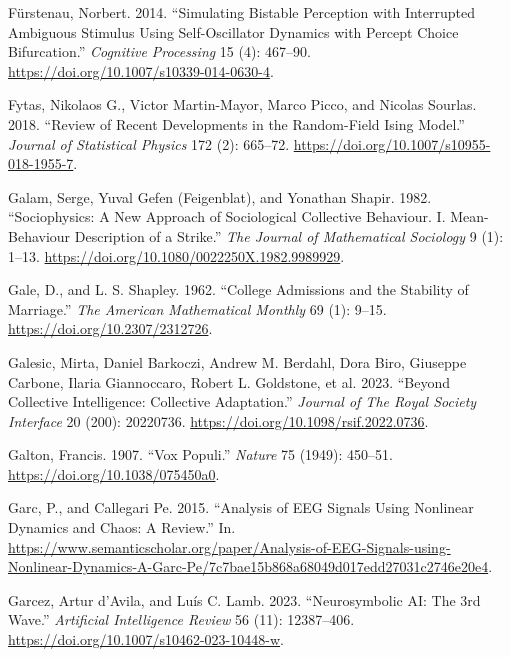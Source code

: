 \documentclass[
  a4paper,
  DIV=11,
  numbers=noendperiod]{scrreprt}
\newlength{\cslhangindent}
\newlength{\cslentryspacingunit} %
\newenvironment{CSLReferences}[2] %
 {%
  \setlength{\parindent}{0pt}
  \ifodd #1
  \let\oldpar\par
  \def\par{\hangindent=\cslhangindent\oldpar}
  \fi
  \setlength{\parskip}{#2\cslentryspacingunit}
 }%
 {}
\begin{document}
\begin{CSLReferences}{1}{0}
\leavevmode{}%
Fürstenau, Norbert. 2014. {``Simulating Bistable Perception with
Interrupted Ambiguous Stimulus Using Self-Oscillator Dynamics with
Percept Choice Bifurcation.''} \emph{Cognitive Processing} 15 (4):
467--90. \url{https://doi.org/10.1007/s10339-014-0630-4}.

\leavevmode{}%
Fytas, Nikolaos G., Victor Martin-Mayor, Marco Picco, and Nicolas
Sourlas. 2018. {``Review of Recent Developments in the Random-Field
{Ising} Model.''} \emph{Journal of Statistical Physics} 172 (2):
665--72. \url{https://doi.org/10.1007/s10955-018-1955-7}.

\leavevmode{}%
Galam, Serge, Yuval Gefen (Feigenblat), and Yonathan Shapir. 1982.
{``Sociophysics: {A} New Approach of Sociological Collective Behaviour.
{I}. Mean-Behaviour Description of a Strike.''} \emph{The Journal of
Mathematical Sociology} 9 (1): 1--13.
\url{https://doi.org/10.1080/0022250X.1982.9989929}.

\leavevmode{}%
Gale, D., and L. S. Shapley. 1962. {``College {Admissions} and the
{Stability} of {Marriage}.''} \emph{The American Mathematical Monthly}
69 (1): 9--15. \url{https://doi.org/10.2307/2312726}.

\leavevmode{}%
Galesic, Mirta, Daniel Barkoczi, Andrew M. Berdahl, Dora Biro, Giuseppe
Carbone, Ilaria Giannoccaro, Robert L. Goldstone, et al. 2023. {``Beyond
Collective Intelligence: {Collective} Adaptation.''} \emph{Journal of
The Royal Society Interface} 20 (200): 20220736.
\url{https://doi.org/10.1098/rsif.2022.0736}.

\leavevmode{}%
Galton, Francis. 1907. {``Vox Populi.''} \emph{Nature} 75 (1949):
450--51. \url{https://doi.org/10.1038/075450a0}.

\leavevmode{}%
Garc, P., and Callegari Pe. 2015. {``Analysis of EEG Signals Using
Nonlinear Dynamics and Chaos: A Review.''} In.
\url{https://www.semanticscholar.org/paper/Analysis-of-EEG-Signals-using-Nonlinear-Dynamics-A-Garc-Pe/7c7bae15b868a68049d017edd27031c2746e20e4}.

\leavevmode{}%
Garcez, Artur d'Avila, and Luís C. Lamb. 2023. {``Neurosymbolic AI: The
3rd Wave.''} \emph{Artificial Intelligence Review} 56 (11): 12387--406.
\url{https://doi.org/10.1007/s10462-023-10448-w}.


\end{CSLReferences}
\end{document}
